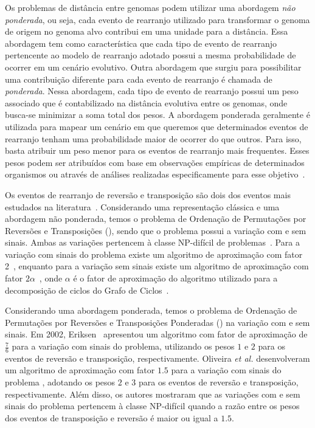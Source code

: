 
Os problemas de distância entre genomas podem utilizar uma abordagem \emph{não ponderada}, ou seja, cada evento de rearranjo utilizado para transformar o genoma de origem no genoma alvo contribui em uma unidade para a distância. Essa abordagem tem como característica que cada tipo de evento de rearranjo pertencente ao modelo de rearranjo adotado possui a mesma probabilidade de ocorrer em um cenário evolutivo. Outra abordagem que surgiu para possibilitar uma contribuição diferente para cada evento de rearranjo é chamada de \emph{ponderada}. Nessa abordagem, cada tipo de evento de rearranjo possui um peso associado que é contabilizado na distância evolutiva entre os genomas, onde busca-se minimizar a soma total dos pesos. A abordagem ponderada geralmente é utilizada para mapear um cenário em que queremos que determinados eventos de rearranjo tenham uma probabilidade maior de ocorrer do que outros. Para isso, basta atribuir um peso menor para os eventos de rearranjo mais frequentes. Esses pesos podem ser atribuídos com base em observações empíricas de determinados organismos ou através de análises realizadas especificamente para esse objetivo~\cite{2008-bader-etal,2001-eriksen}. 

Os eventos de rearranjo de reversão e transposição são dois dos eventos mais estudados na literatura~\cite{2002-berman-etal,2006-elias-hartman,2022-silva-etal}. Considerando uma representação clássica e uma abordagem não ponderada, temos o problema de Ordenação de Permutações por Reversões e Transposições (\SbRT), sendo que o problema possui a variação com e sem sinais. Ambas as variações pertencem à classe NP-difícil de problemas~\cite{2019b-oliveira-etal}. Para a variação com sinais do problema existe um algoritmo de aproximação com fator 2~\cite{1998-walter-etal}, enquanto para a variação sem sinais existe um algoritmo de aproximação com fator $2\alpha$~\cite{2008-rahman-etal}, onde $\alpha$ é o fator de aproximação do algoritmo utilizado para a decomposição de ciclos do Grafo de Ciclos~\cite{1999a-caprara,2013-chen}.

Considerando uma abordagem ponderada, temos o problema de Ordenação de Permutações por Reversões e Transposições Ponderadas (\SbWRT) na variação com e sem sinais. Em 2002, Eriksen~\cite{2002-eriksen} apresentou um algoritmo com fator de aproximação de $\frac{7}{6}$ para a variação com sinais do problema, utilizando os pesos $1$ e $2$ para os eventos de reversão e transposição, respectivamente. Oliveira \textit{et al.}\cite{2019a-oliveira-etal} desenvolveram um algoritmo de aproximação com fator $1.5$ para a variação com sinais do problema \SbWRT{}, adotando os pesos $2$ e $3$ para os eventos de reversão e transposição, respectivamente. Além disso, os autores mostraram que as variações com e sem sinais do problema \SbWRT{} pertencem à classe NP-difícil quando a razão entre os pesos dos eventos de transposição e reversão é maior ou igual a $1.5$.  

